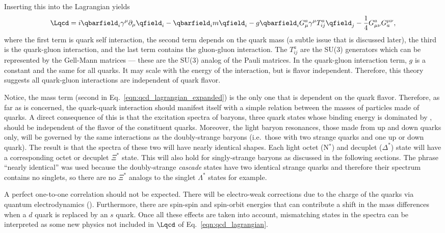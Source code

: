 Inserting this into the Lagrangian yields
\begin{equation}
    \Lqcd =
    i \qbarfield_i \gamma^\mu \partial_\mu \qfield_i
    - \qbarfield_i m \qfield_i
    - g \qbarfield_i G^a_\mu \gamma^\mu T^a_{ij} \qfield_j
    - \frac{1}{4} G^a_{\mu\nu}G^{\mu\nu}_a,
    \label{eqn:qcd_lagrangian_expanded}
\end{equation}
where the first term is quark self interaction, the second term depends on the quark mass (a subtle issue that is discussed later), the third is the quark-gluon interaction, and the last term contains the gluon-gluon interaction. The $T^{a}_{ij}$ are the SU(3) generators which can be represented by the Gell-Mann matrices --- these are the SU(3) analog of the Pauli matrices. In the quark-gluon interaction term, $g$ is a constant and the same for all quarks. It may scale with the energy of the interaction, but is flavor independent. Therefore, this theory suggests all quark-gluon interactions are independent of quark flavor.

Notice, the mass term (second in Eq.~\ref{eqn:qcd_lagrangian_expanded}) is the only one that is dependent on the quark flavor. Therefore, as far as  is concerned, the quark-quark interaction should manifest itself with a simple relation between the masses of particles made of  quarks. A direct consequence of this is that the excitation spectra of baryons, three quark states whose binding energy is dominated by , should be independent of the flavor of the constituent quarks. Moreover, the light baryon resonances, those made from up and down quarks only, will be governed by the same interactions as the doubly-strange baryons (i.e.\ those with two strange quarks and one up or down quark). The result is that the spectra of these two will have nearly identical shapes. Each light octet (N$^*$) and decuplet ($\Delta^*$) state will have a corresponding octet or decuplet $\Xi^*$ state. This will also hold for singly-strange baryons as discussed in the following sections. The phrase ``nearly identical'' was used because the doubly-strange \emph{cascade} states have two identical strange quarks and therefore their spectrum contains no singlets, so there are no $\Xi^*$ analogs to the singlet $\Lambda^*$ states for example.

A perfect one-to-one correlation should not be expected. There will be electro-weak corrections due to the charge of the quarks via quantum electrodynamics (). Furthermore, there are spin-spin and spin-orbit energies that can contribute a shift in the mass differences when a $d$ quark is replaced by an $s$ quark. Once all these effects are taken into account, mismatching states in the spectra can be interpreted as some new physics not included in $\Lqcd$ of Eq.~\ref{eqn:qcd_lagrangian}.

